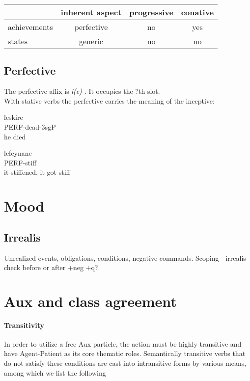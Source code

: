 \documentclass[8pt]{book}
\begin{document}
\begin{center}
\begin{tabular}{|l|c|c|c|}
\hline
& inherent aspect & progressive & conative \\ \hline
achievements & perfective & no & yes \\ \hline
states & generic & no & no \\\hline
\end{tabular}
\end{center}

\subsection{Perfective}
The perfective affix is \textit{l(e)-}. It occupies the ?th slot.\\

With stative verbs the perfective carries the meaning of the inceptive:

\begin{exe}
	\ex \gll leskire \\
	PERF-dead-3sgP \\
	\trans he died
	
	\ex \gll lefeynane \\
	PERF-stiff \\
	\trans it stiffened, it got stiff

\end{exe}



\section{Mood}
\subsection{Irrealis}
Unrealized events, obligations, conditions, negative commands. Scoping - irrealis check before or after +neg +q?

\section{Aux and class agreement}

\paragraph{Transitivity}
In order to utilize a free Aux particle, the action must be highly transitive and have Agent-Patient as its core thematic roles. Semantically transitive verbs that do not satisfy these conditions are cast into intransitive forms by various means, among which we list the following
\end{document}
